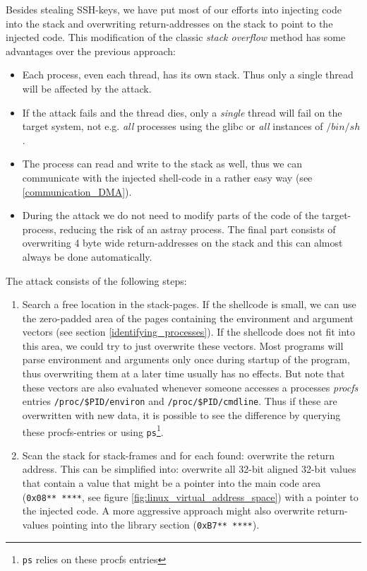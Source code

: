 \label{overwriting_stack} Besides stealing SSH-keys, we have put most of our
efforts into injecting code into the stack and overwriting return-addresses on
the stack to point to the injected code. This modification of the classic
\emph{stack overflow} method has some advantages over the previous approach:

\begin{itemize}

	\item Each process, even each thread, has its own stack. Thus only a
		single thread will be affected by the attack.

	\item If the attack fails and the thread dies, only a \emph{single}
		thread will fail on the target system, not e.g\@. \emph{all}
		processes using the glibc or \emph{all} instances of $/bin/sh$.

	\item The process can read and write to the stack as well, thus we can
		communicate with the injected shell-code in a rather easy way
		(see \ref{communication_DMA}).

	\item During the attack we do not need to modify parts of the code of
		the target-process, reducing the risk of an astray process. The
		final part consists of overwriting 4 byte wide return-addresses
		on the stack and this can almost always be done automatically.

\end{itemize}

The attack consists of the following steps:

\begin{enumerate}

	\item Search a free location in the stack-pages. If the shellcode is
		small, we can use the zero-padded area of the pages containing
		the environment and argument vectors (see section
		\ref{identifying_processes}). If the shellcode does not fit into
		this area, we could try to just overwrite these vectors. Most
		programs will parse environment and arguments only once during startup of
		the program, thus overwriting them at a later time usually has no effects.
		But note that these vectors are also evaluated whenever someone accesses a
		processes \emph{procfs} entries \texttt{/proc/\$PID/environ} and
		\texttt{/proc/\$PID/cmdline}. Thus if these are overwritten with new data,
		it is possible to see the difference by querying these procfs-entries or
		using \texttt{ps}\footnote{\texttt{ps} relies on these procfs entries}.


	\item Scan the stack for stack-frames and for each found: overwrite the
		return address. This can be simplified into: overwrite all
		32-bit aligned 32-bit values that contain a value that might be
		a pointer into the main code area (\texttt{0x08**~****}, see
		figure \ref{fig:linux_virtual_address_space}) with a pointer to
		the injected code.  A more aggressive approach might also
		overwrite return-values pointing into the library section
		(\texttt{0xB7**~****}).

\end{enumerate}

